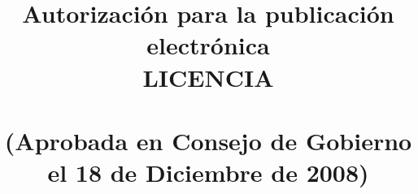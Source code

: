 % 
% 
% 
% 
% 
% 
% 
% 


% 



% 

\title{Autorización \mybookAutorDelOrDeLa{} \mybookAutorOrAutora{} para la publicación
  electrónica \\ LICENCIA\\~\\ \large(Aprobada en Consejo de Gobierno el 18 de Diciembre de 2008)} 
\date{}                                            %

